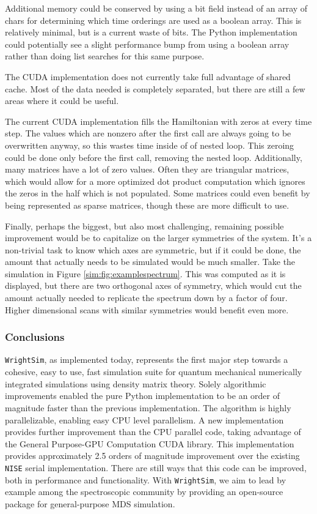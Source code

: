 Additional memory could be conserved by using a bit field instead of an
array of chars for determining which time orderings are used as a
boolean array. This is relatively minimal, but is a current waste of
bits. The Python implementation could potentially see a slight
performance bump from using a boolean array rather than doing list
searches for this same purpose.

The CUDA implementation does not currently take full advantage of shared
cache. Most of the data needed is completely separated, but there are
still a few areas where it could be useful.

The current CUDA implementation fills the Hamiltonian with zeros at
every time step. The values which are nonzero after the first call are
always going to be overwritten anyway, so this wastes time inside of of
nested loop. This zeroing could be done only before the first call,
removing the nested loop. Additionally, many matrices have a lot of zero
values. Often they are triangular matrices, which would allow for a more
optimized dot product computation which ignores the zeros in the half
which is not populated. Some matrices could even benefit by being
represented as sparse matrices, though these are more difficult to use.

Finally, perhaps the biggest, but also most challenging, remaining
possible improvement would be to capitalize on the larger symmetries of
the system. It's a non-trivial task to know which axes are symmetric,
but if it could be done, the amount that actually needs to be simulated
would be much smaller. Take the simulation in Figure
\ref{sim:fig:examplespectrum}. This was computed as it is displayed, but
there are two orthogonal axes of symmetry, which would cut the amount
actually needed to replicate the spectrum down by a factor of four.
Higher dimensional scans with similar symmetries would benefit even
more.

\hypertarget{conclusions}{%
\subsubsection{Conclusions}\label{conclusions}}

\texttt{WrightSim}, as implemented today, represents the first major
step towards a cohesive, easy to use, fast simulation suite for quantum
mechanical numerically integrated simulations using density matrix
theory. Solely algorithmic improvements enabled the pure Python
implementation to be an order of magnitude faster than the previous
implementation. The algorithm is highly parallelizable, enabling easy
CPU level parallelism. A new implementation provides further improvement
than the CPU parallel code, taking advantage of the General Purpose-GPU
Computation CUDA library. This implementation provides approximately 2.5
orders of magnitude improvement over the existing \texttt{NISE} serial
implementation. There are still ways that this code can be improved,
both in performance and functionality. With \texttt{WrightSim}, we aim
to lead by example among the spectroscopic community by providing an
open-source package for general-purpose MDS simulation.


\clearpage
